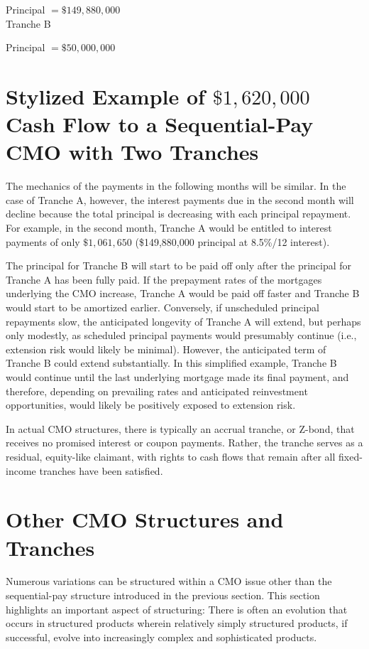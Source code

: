 \documentclass[11pt]{article}
\begin{document}
Principal $=\$ 149,880,000$\\
Tranche B

Principal $=\$ 50,000,000$

\section*{Stylized Example of $\$ 1,620,000$ Cash Flow to a Sequential-Pay CMO with Two Tranches}
The mechanics of the payments in the following months will be similar. In the case of Tranche A, however, the interest payments due in the second month will decline because the total principal is decreasing with each principal repayment. For example, in the second month, Tranche A would be entitled to interest payments of only $\$ 1,061,650$ (\$149,880,000 principal at 8.5\%/12 interest).

The principal for Tranche B will start to be paid off only after the principal for Tranche A has been fully paid. If the prepayment rates of the mortgages underlying the CMO increase, Tranche A would be paid off faster and Tranche B would start to be amortized earlier. Conversely, if unscheduled principal repayments slow, the anticipated longevity of Tranche A will extend, but perhaps only modestly, as scheduled principal payments would presumably continue (i.e., extension risk would likely be minimal). However, the anticipated term of Tranche B could extend substantially. In this simplified example, Tranche B would continue until the last underlying mortgage made its final payment, and therefore, depending on prevailing rates and anticipated reinvestment opportunities, would likely be positively exposed to extension risk.

In actual CMO structures, there is typically an accrual tranche, or Z-bond, that receives no promised interest or coupon payments. Rather, the tranche serves as a residual, equity-like claimant, with rights to cash flows that remain after all fixed-income tranches have been satisfied.

\section*{Other CMO Structures and Tranches}
Numerous variations can be structured within a CMO issue other than the sequential-pay structure introduced in the previous section. This section highlights an important aspect of structuring: There is often an evolution that occurs in structured products wherein relatively simply structured products, if successful, evolve into increasingly complex and sophisticated products.
\end{document}
